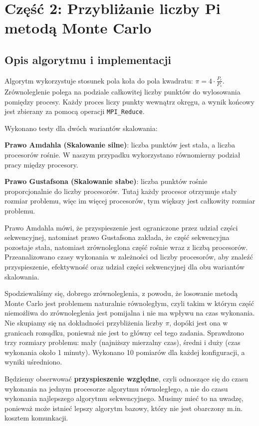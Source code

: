 \documentclass{article}
\begin{document}
\section{Część 2: Przybliżanie liczby Pi metodą Monte Carlo}

\subsection{Opis algorytmu i implementacji}
Algorytm wykorzystuje stosunek pola koła do pola kwadratu: $\pi = 4 \cdot \frac{P_{c}}{P_{s}}$. 
Zrównoleglenie polega na podziale całkowitej liczby punktów do wylosowania pomiędzy procesy. 
Każdy proces liczy punkty wewnątrz okręgu, a wynik końcowy jest zbierany za pomocą operacji \texttt{MPI\_Reduce}.

Wykonano testy dla dwóch wariantów skalowania:
\begin{compactitem}
    \item \textbf{Prawo Amdahla (Skalowanie silne)}: liczba punktów jest stała, a liczba procesorów rośnie. W naszym przypadku wykorzystano równomierny podział pracy między procesory.
    \item \textbf{Prawo Gustafsona (Skalowanie słabe)}: liczba punktów rośnie proporcjonalnie do liczby procesorów. Tutaj każdy procesor otrzymuje stały rozmiar problemu, więc im więcej procesorów, tym większy jest całkowity rozmiar problemu.
\end{compactitem}

Prawo Amdahla mówi, że przyspieszenie jest ograniczone przez udział części sekwencyjnej, natomiast prawo Gustafsona zakłada, że część sekwencyjna pozostaje stała, natomiast zrównoleglona część rośnie wraz z liczbą procesorów. 
Przeanalizowano czasy wykonania w zależności od liczby procesorów, aby znaleźć przyspieszenie, efektywność oraz udział części sekwencyjnej dla obu wariantów skalowania. 

Spodziewaliśmy się, dobrego zrównoleglenia, z powodu, że losowanie metodą Monte Carlo jest problemem naturalnie równoległym, czyli takim w którym część niemożliwa do zrównoleglenia jest pomijalna i nie ma wpływu na czas wykonania. 
Nie skupiamy się na dokładności przybliżenia liczby $\pi$, dopóki jest ona w granicach rozsądku, ponieważ nie jest to główny cel tego zadania. 
Sprawdzono trzy rozmiary problemu: mały (najniższy mierzalny czas), średni i duży (czas wykonania około 1 minuty). Wykonano 10 pomiarów dla każdej konfiguracji, a wyniki uśredniono. 

Będziemy obserwować \textbf{przyspieszenie względne}, czyli odnoszące się do czasu wykonania na jednym procesorze algorytmu równoległego, a nie do czasu wykonania najlepszego algorytmu sekwencyjnego. 
Musimy mieć to na uwadzę, ponieważ może istnieć lepszy algorytm bazowy, który nie jest obarczony m.in. kosztem komunkacji.
\end{document}

